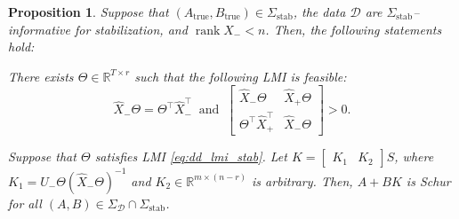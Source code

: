 \documentclass[9pt,shortpaper,twoside,web]{ieeecolor}
\DeclareMathOperator{\rank}{rank}
\newtheorem{proposition}[theorem]{Proposition}
\newtheorem{remark}[theorem]{Remark}
\begin{document}
\begin{proposition}
\label{prop:K=[K1 K2]}
Suppose that $(A_\text{true},B_\text{true})\in\Sigma_\text{stab}$, the data $\mathcal{D}$ are $\Sigma_\text{stab}$--informative for stabilization, and \mbox{$\rank X_-<n$}. Then, the following statements hold:
\begin{enumerate}[label=(\alph*),ref=\ref{prop:K=[K1 K2]}(\alph*)]
    \item\label{prop:K=[K1 K2](a)} There exists $\Theta\in\mathbb{R}^{T\times r}$ such that the following LMI is feasible:
\begin{equation}
\label{eq:dd_lmi_stab}
\hat{X}_-\Theta=\Theta^\top \hat{X}_-^\top\ \text{ and }\ \begin{bmatrix}
\hat{X}_-\Theta & \hat{X}_+\Theta \\
\Theta^\top \hat{X}_+^\top & \hat{X}_-\Theta
\end{bmatrix}>0.
\end{equation}
\item\label{prop:K=[K1 K2](b)} Suppose that $\Theta$ satisfies LMI \eqref{eq:dd_lmi_stab}. Let $K=\begin{bmatrix}
K_1 & K_2
\end{bmatrix}S$, where $K_1=U_-\Theta(\hat{X}_-\Theta)^{-1}$ and $K_2\in\mathbb{R}^{m\times (n-r)}$ is arbitrary. Then, $A+BK$ is Schur for all  $(A,B)\in\Sigma_\mathcal{D}\cap \Sigma_\text{stab}$. 
\end{enumerate}
\end{proposition}

\end{document}
